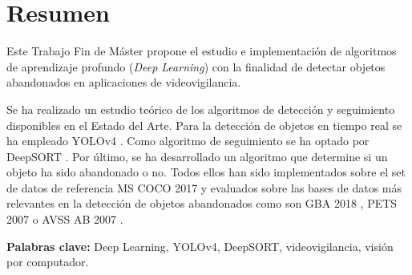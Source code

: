 
\chapter*{Resumen}
\label{cha:resumen}


Este Trabajo Fin de Máster propone el estudio e implementación de algoritmos de aprendizaje profundo (\textit{Deep Learning}) con la finalidad de detectar objetos abandonados en aplicaciones de videovigilancia.

Se ha realizado un estudio teórico de los algoritmos de detección y seguimiento disponibles en el Estado del Arte. Para la detección de objetos en tiempo real se ha empleado YOLOv4 \cite{bochkovskiy2020yolov4}. Como algoritmo de seguimiento se ha optado por DeepSORT \cite{Wojke2017simple}. Por último, se ha desarrollado un algoritmo que determine si un objeto ha sido abandonado o no. Todos ellos han sido implementados sobre el set de datos de referencia MS COCO 2017 \cite{lin2015microsoft} y evaluados sobre las bases de datos más relevantes en la detección de objetos abandonados como son GBA 2018 \cite{gba-dataset}, PETS 2007 \cite{pets2007-dataset} o AVSS AB 2007 \cite{AVSSAB2007-dataset}.

\textbf{Palabras clave:} Deep Learning, YOLOv4, DeepSORT, videovigilancia, visión por computador.